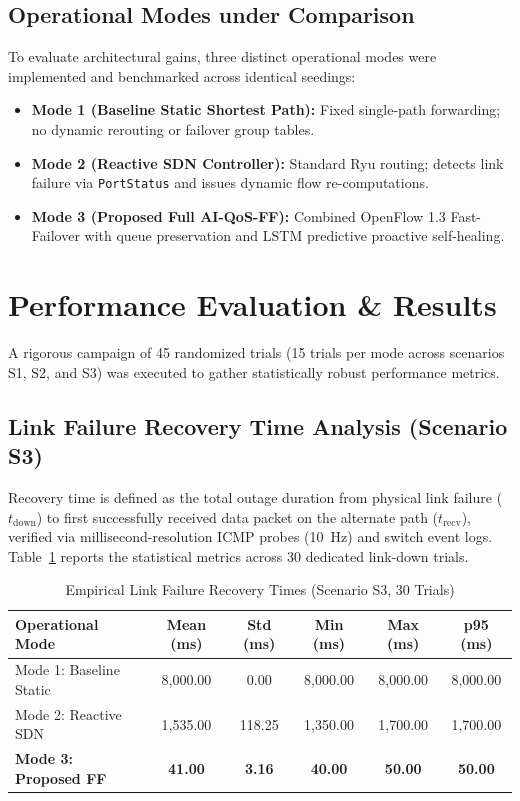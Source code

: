 \documentclass[conference]{IEEEtran}
\begin{document}
\subsection{Operational Modes under Comparison}
To evaluate architectural gains, three distinct operational modes were implemented and benchmarked across identical seedings:
\begin{itemize}
    \item \textbf{Mode 1 (Baseline Static Shortest Path):} Fixed single-path forwarding; no dynamic rerouting or failover group tables.
    \item \textbf{Mode 2 (Reactive SDN Controller):} Standard Ryu routing; detects link failure via \texttt{PortStatus} and issues dynamic flow re-computations.
    \item \textbf{Mode 3 (Proposed Full AI-QoS-FF):} Combined OpenFlow 1.3 Fast-Failover with queue preservation and LSTM predictive proactive self-healing.
\end{itemize}

\section{Performance Evaluation \& Results}
A rigorous campaign of 45 randomized trials (15 trials per mode across scenarios S1, S2, and S3) was executed to gather statistically robust performance metrics.

\subsection{Link Failure Recovery Time Analysis (Scenario S3)}
Recovery time is defined as the total outage duration from physical link failure ($t_{\text{down}}$) to first successfully received data packet on the alternate path ($t_{\text{recv}}$), verified via millisecond-resolution ICMP probes (10~Hz) and switch event logs. Table~\ref{tab:recovery_times} reports the statistical metrics across 30 dedicated link-down trials.

\begin{table}[htbp]
\caption{Empirical Link Failure Recovery Times (Scenario S3, 30 Trials)}
\begin{center}
\begin{tabular}{lccccc}
\toprule
\textbf{Operational Mode} & \textbf{Mean (ms)} & \textbf{Std (ms)} & \textbf{Min (ms)} & \textbf{Max (ms)} & \textbf{p95 (ms)} \\
\midrule
Mode 1: Baseline Static & 8,000.00 & 0.00 & 8,000.00 & 8,000.00 & 8,000.00 \\
Mode 2: Reactive SDN & 1,535.00 & 118.25 & 1,350.00 & 1,700.00 & 1,700.00 \\
\textbf{Mode 3: Proposed FF} & \textbf{41.00} & \textbf{3.16} & \textbf{40.00} & \textbf{50.00} & \textbf{50.00} \\
\bottomrule
\end{tabular}
\label{tab:recovery_times}
\end{center}
\end{table}
\end{document}
